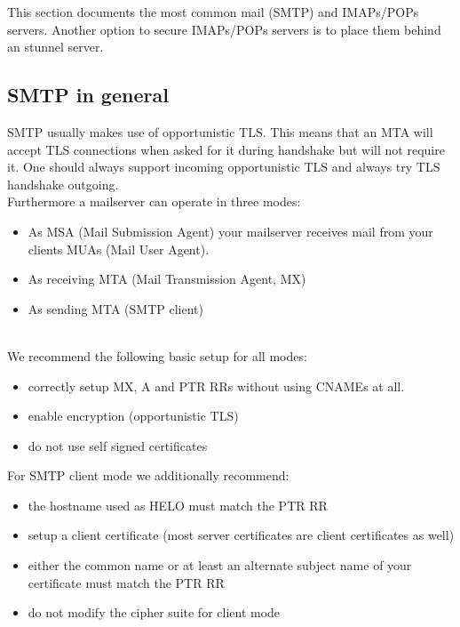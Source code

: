 
This section documents the most common mail (SMTP) and IMAPs/POPs servers. Another option to secure IMAPs/POPs servers is to place them behind an stunnel server. 



\subsection{SMTP in general}
\label{subsection:smtp_general}

SMTP usually makes use of opportunistic TLS. This means that an MTA will accept TLS connections when asked for it during handshake but will not require it. One should always support incoming opportunistic TLS and always try TLS handshake outgoing.\\

Furthermore a mailserver can operate in three modes:
\begin{itemize}
\item As MSA (Mail Submission Agent) your mailserver receives mail from your clients MUAs (Mail User Agent).
\item As receiving MTA (Mail Transmission Agent, MX)
\item As sending MTA (SMTP client)
\end{itemize}
\mbox{}\\
We recommend the following basic setup for all modes:
\begin{itemize}
\item correctly setup MX, A and PTR RRs without using CNAMEs at all.
\item enable encryption (opportunistic TLS)
\item do not use self signed certificates
\end{itemize}

For SMTP client mode we additionally recommend:
\begin{itemize}
\item the hostname used as HELO must match the PTR RR
\item setup a client certificate (most server certificates are client certificates as well)
\item either the common name or at least an alternate subject name of your certificate must match the PTR RR
\item do not modify the cipher suite for client mode
\end{itemize}

